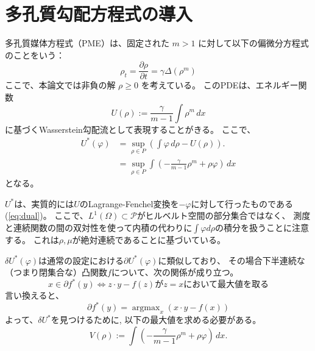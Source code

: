 \section{多孔質勾配方程式の導入}
\label{sect:多孔質勾配方程式の導入}
多孔質媒体方程式（PME）は、固定された \(m > 1\) に対して以下の偏微分方程式のことをいう：
\[
\rho_t = \frac{{\partial \rho}}{{\partial t}} = \gamma\Delta (\rho^m)
\]
ここで、本論文では非負の解 \(\rho \geq 0\) を考えている。
このPDEは、エネルギー関数
\[
    U(\rho) := \frac{\gamma}{{m-1}} \int \rho^m \, dx
\]
に基づくWasserstein勾配流として表現することがきる。
ここで、
\begin{align*}
    U^*(\varphi) &= \sup_{\rho \in P} \left( \int \varphi \, d\rho - U(\rho) \right).\\
                &= \sup_{\rho \in P} \int \left(- \frac{\gamma}{m-1}\rho^m + \rho\varphi\right) \, dx
\end{align*}
となる。

$U^*$は、実質的には$U$のLagrange-Fenchel変換を$-\varphi$に対して行ったものである(\ref{eq:dual})。
ここで、$L^1(\Omega) \subset \mathcal{P}$がヒルベルト空間の部分集合ではなく、
測度と連続関数の間の双対性を使って内積の代わりに$\int \varphi d \rho$の積分を扱うことに注意する。
これは$\rho, \mu$が絶対連続であることに基づいている。

{\color{teal}
$\delta U^*(\varphi)$は通常の設定における$\partial U^*(\varphi)$に類似しており、
その場合下半連続な（つまり閉集合な）凸関数$f$について、次の関係が成り立つ。
}
\[
    x \in \partial f^*(y) \iff z \cdot y - f(z) \text{が} z = x \text{において最大値を取る}
\]
言い換えると、
\[
    \partial f^*(y) = \operatorname{argmax}_x (x \cdot y - f(x))
\]
{\color{teal}
よって、$\delta U^*$を見つけるために, 以下の最大値を求める必要がある。
\[
    V(\rho) := \int \left(- \frac{\gamma}{m-1}\rho^m + \rho\varphi\right) \, dx.
\]
}

